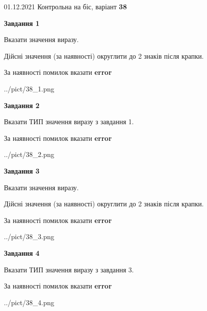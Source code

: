 \documentclass[11pt, ukrainian]{article}
\begin{document}
{01.12.2021 Контрольна на біс, варіант  \No \textbf { 38 }\par}
{
\begin {large}
{\begin {center}\textbf{Завдання 1}\end {center}}\par
Вказати значення виразу. \par
Дійсні значення (за наявності) округлити до 2 знаків після крапки. \par
За наявності помилок вказати \textbf{error}

\begin{center}
	{../pict/38_1.png}
\end{center}
\newpage

{\begin {center}\textbf{Завдання 2}\end {center}}\par
Вказати ТИП значення виразу з завдання 1. \par
За наявності помилок вказати \textbf{error}

\begin{center}
	{../pict/38_2.png}
\end{center}
\newpage

{\begin {center}\textbf{Завдання 3}\end {center}}\par
Вказати значення виразу. \par
Дійсні значення (за наявності) округлити до 2 знаків після крапки. \par
За наявності помилок вказати \textbf{error}

\begin{center}
	{../pict/38_3.png}
\end{center}
\newpage

{\begin {center}\textbf{Завдання 4}\end {center}}\par
Вказати ТИП значення виразу з завдання 3. \par
За наявності помилок вказати \textbf{error}

\begin{center}
	{../pict/38_4.png}
\end{center}
\newpage


\end{large}}
\end{document}
